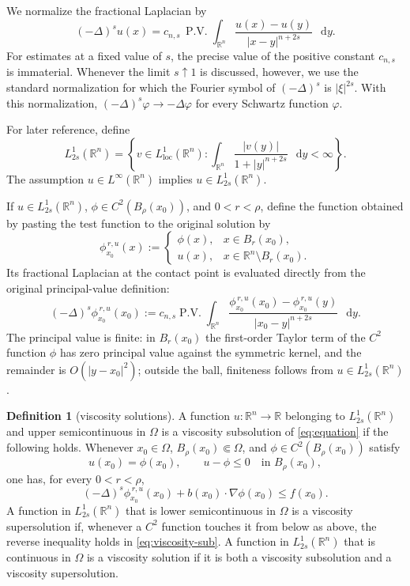 \documentclass[reqno]{amsart}
\numberwithin{equation}{section}
\theoremstyle{plain}
\theoremstyle{definition}
\newtheorem{definition}[theorem]{Definition}
\theoremstyle{remark}
\newcommand{\R}{\mathbb R}
\newcommand{\differential}{\mathop{}\!\mathrm d}
\begin{document}
We normalize the fractional Laplacian by
\begin{equation}\label{eq:frac-lap}
 (-\Delta)^s u(x)=c_{n,s}\,\operatorname{P.V.}
 \int_{\R^n}\frac{u(x)-u(y)}{|x-y|^{n+2s}}\,\differential y.
\end{equation}
For estimates at a fixed value of $s$, the precise value of the positive
constant $c_{n,s}$ is immaterial.  Whenever the limit $s\uparrow1$ is
discussed, however, we use the standard normalization for which the Fourier
symbol of $(-\Delta)^s$ is $|\xi|^{2s}$.  With this normalization,
$(-\Delta)^s\varphi\to-\Delta\varphi$ for every Schwartz function
$\varphi$.

For later reference, define
\[
 L^1_{2s}(\R^n)=\left\{v\in L^1_{\mathrm{loc}}(\R^n):
 \int_{\R^n}\frac{|v(y)|}{1+|y|^{n+2s}}\,\differential y<\infty\right\}.
\]
The assumption $u\in L^\infty(\R^n)$ implies $u\in L^1_{2s}(\R^n)$.

If $u\in L^1_{2s}(\R^n)$, $\phi\in C^2(B_\rho(x_0))$, and
$0<r<\rho$, define the function obtained by pasting the test function to
the original solution by
\begin{equation}\label{eq:pasted-test}
 \phi^{\,r,u}_{x_0}(x):=
 \begin{cases}
  \phi(x),&x\in B_r(x_0),\\
  u(x),&x\in\R^n\setminus B_r(x_0).
 \end{cases}
\end{equation}
Its fractional Laplacian at the contact point is evaluated directly from
the original principal-value definition:
\begin{equation}\label{eq:pasted-fractional-laplacian}
 (-\Delta)^s\phi^{\,r,u}_{x_0}(x_0)
 :=c_{n,s}\operatorname{P.V.}\int_{\R^n}
 \frac{\phi^{\,r,u}_{x_0}(x_0)-\phi^{\,r,u}_{x_0}(y)}
 {|x_0-y|^{n+2s}}\,\differential y.
\end{equation}
The principal value is finite: in $B_r(x_0)$ the first-order Taylor term
of the $C^2$ function $\phi$ has zero principal value against the symmetric
kernel, and the remainder is $O(|y-x_0|^2)$; outside the ball, finiteness
follows from $u\in L^1_{2s}(\R^n)$.

\begin{definition}[viscosity solutions]\label{def:viscosity}
A function $u:\R^n\to\R$ belonging to $L^1_{2s}(\R^n)$ and upper
semicontinuous in $\Omega$ is a viscosity
subsolution of \eqref{eq:equation} if the following holds.  Whenever
$x_0\in\Omega$, $B_\rho(x_0)\Subset\Omega$, and
$\phi\in C^2(B_\rho(x_0))$ satisfy
\[
 u(x_0)=\phi(x_0),\qquad
 u-\phi\le0\quad\text{in }B_\rho(x_0),
\]
one has, for every $0<r<\rho$,
\begin{equation}\label{eq:viscosity-sub}
 (-\Delta)^s\phi^{\,r,u}_{x_0}(x_0)
 +b(x_0)\cdot\nabla\phi(x_0)\le f(x_0).
\end{equation}
A function in $L^1_{2s}(\R^n)$ that is lower semicontinuous in $\Omega$ is
a viscosity supersolution if, whenever a $C^2$ function touches it from
below as above, the reverse inequality holds in
\eqref{eq:viscosity-sub}.  A function in $L^1_{2s}(\R^n)$ that is continuous
in $\Omega$ is a viscosity solution if it is both a viscosity subsolution
and a viscosity supersolution.
\end{definition}
\end{document}

